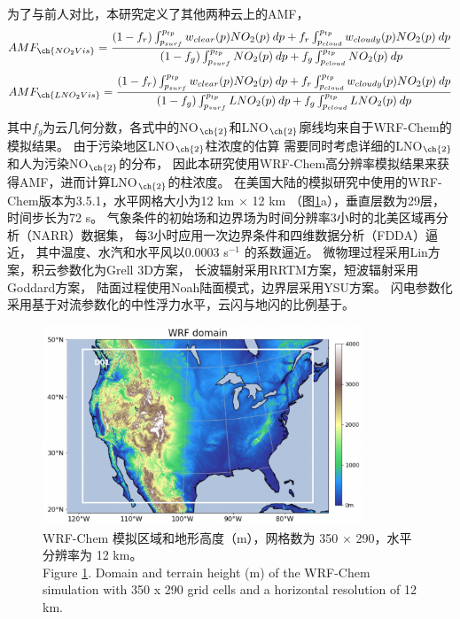 为了与前人对比，本研究定义了其他两种云上的AMF，
\begin{equation} \label{eq:AMF_NO2Vis}
AMF_{\ch{NO_2Vis}} = \frac{(1-f_r) \int_{p_{surf}}^{p_{tp}} w_{clear}(p) NO_2(p) \: dp + f_r \int_{p_{cloud}}^{p_{tp}} w_{cloudy}(p) NO_2(p) \: dp}{(1-f_g) \int_{p_{surf}}^{p_{tp}} NO_2(p) \: dp + f_g \int_{p_{cloud}}^{p_{tp}} NO_2(p) \: dp}
\end{equation}
\begin{equation} \label{eq:AMF_LNO2Vis}
AMF_{\ch{LNO_2Vis}} = \frac{(1-f_r) \int_{p_{surf}}^{p_{tp}} w_{clear}(p) NO_2(p) \: dp + f_r \int_{p_{cloud}}^{p_{tp}} w_{cloudy}(p) NO_2(p) \: dp}{(1-f_g) \int_{p_{surf}}^{p_{tp}} LNO_2(p) \: dp + f_g \int_{p_{cloud}}^{p_{tp}} LNO_2(p) \: dp}
\end{equation}
其中$f_g$为云几何分数，各式中的NO$_{\ch{2}}$和LNO$_{\ch{2}}$廓线均来自于WRF-Chem的模拟结果。
由于污染地区LNO$_{\ch{2}}$柱浓度的估算
需要同时考虑详细的LNO$_{\ch{2}}$和人为污染NO$_{\ch{2}}$的分布，
因此本研究使用WRF-Chem高分辨率模拟结果来获得AMF，进而计算LNO$_{\ch{2}}$的柱浓度。
在美国大陆的模拟研究中使用的WRF-Chem版本为3.5.1，水平网格大小为12 km $\times$ 12 km （图\ref{fig:us_domain}a），垂直层数为29层，时间步长为72 s。
气象条件的初始场和边界场为时间分辨率3小时的北美区域再分析（NARR）数据集，
每3小时应用一次边界条件和四维数据分析（FDDA）逼近，
其中温度、水汽和水平风以0.0003 s$^{-1}$ 的系数逼近\citep{Laughner.2017}。
微物理过程采用Lin方案\citep{Lin.1983}，积云参数化为Grell 3D方案\citep{Grell.1993a,Grell.2002a}，
长波辐射采用RRTM方案\citep{Iacono.2008}，短波辐射采用Goddard方案，
陆面过程使用Noah陆面模式\citep{Koren.1999}，边界层采用YSU方案\citep{Hong.2006}。
闪电参数化采用基于对流参数化的中性浮力水平\citep{Pickering.1992}，云闪与地闪的比例基于\citet{Boccippio.2001}。

\begin{figure}[H]
\centering
\includegraphics[width=0.85\textwidth]{./figures/us_domain.png}
\caption{WRF-Chem 模拟区域和地形高度（m），网格数为 350 $\times$ 290，水平分辨率为 12 km。 \\
Figure \ref{fig:us_domain}. Domain and terrain height (m) of the WRF-Chem simulation with 350 x 290 grid cells and a horizontal resolution of 12 km.}
\label{fig:us_domain}
\end{figure}

